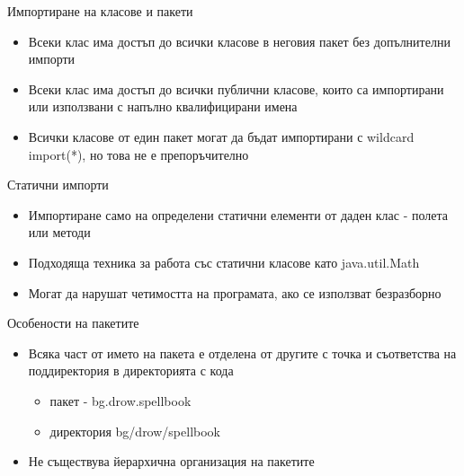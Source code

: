 \documentclass{beamer}
\begin{document}
\begin{frame}{Импортиране на класове и пакети}
  \transdissolve
  \begin{itemize}
  \item Всеки клас има достъп до всички класове в неговия пакет без
    допълнителни импорти \pause
  \item Всеки клас има достъп до всички публични класове, които са
    импортирани или използвани с напълно квалифицирани имена \pause
  \item Всички класове от един пакет могат да бъдат импортирани с
    wildcard import(*), но това не е препоръчително
  \end{itemize}
\end{frame}

\begin{frame}{Статични импорти}
  \transdissolve
  \begin{itemize}
  \item Импортиране само на определени статични елементи от даден клас
    - полета или методи \pause
  \item Подходяща техника за работа със статични класове като
    java.util.Math \pause
  \item Могат да нарушат четимостта на програмата, ако се използват безразборно
  \end{itemize}
\end{frame}

\begin{frame}{Особености на пакетите}
  \transdissolve
  \begin{itemize}
  \item Всяка част от името на пакета е отделена от другите с точка и
    съответства на поддиректория в директорията с кода
    \begin{itemize}
    \item пакет - bg.drow.spellbook
    \item директория bg/drow/spellbook
    \end{itemize}
  \item Не съществува йерархична организация на пакетите
  \end{itemize}
\end{frame}
\end{document}
